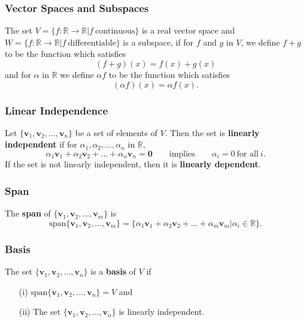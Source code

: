 \documentclass{beamer}
\begin{document}
\begin{frame}
\frametitle{Vector Spaces and Subspaces}
\begin{Example}
The set $V = \{f:\mathbb{R}\to\mathbb{R}| f\ \text{continuous}\}$ is a real vector space and $W = \{f:\mathbb{R}\to\mathbb{R}| f\ \text{differentiable}\}$ is a subspace, if for $f$ and $g$ in $V$, we define $f + g$ to be the function which satisfies 
$$
(f + g)(x) = f(x) + g(x)
$$
and for $\alpha$ in $\mathbb{R}$ we define $\alpha f$ to be the function which satisfies 
$$
(\alpha f)(x) = \alpha f(x).
$$
\end{Example}
\end{frame}

\begin{frame}
\frametitle{Linear Independence}
\begin{Definition}
Let $\{{\boldsymbol v_1}, {\boldsymbol v_2},\ldots, {\boldsymbol v_n}\}$ be a set of elements of $V$. Then the set is {\bf linearly independent} if for $\alpha_1, \alpha_2,\ldots, \alpha_n$ in $\mathbb{R}$, 
$$
\alpha_1 {\boldsymbol v_1} + \alpha_2 {\boldsymbol v_2}+\ldots + \alpha_n {\boldsymbol v_n} = {\boldsymbol 0} \qquad\text{implies}\qquad \alpha_i = 0\ \text{for all}\ i.
$$
If the set is not linearly independent, then it is {\bf linearly dependent}. 
\end{Definition}

\end{frame}

\begin{frame}
\frametitle{Span}
\begin{Definition}
The {\bf span} of $\{{\boldsymbol v_1}, {\boldsymbol v_2},\ldots, {\boldsymbol v_m}\}$ is 
$$
\text{span}\{{\boldsymbol v_1}, {\boldsymbol v_2},\ldots, {\boldsymbol v_m}\} = \{\alpha_1{\boldsymbol v_1} + \alpha_2{\boldsymbol v_2} + \ldots + \alpha_m {\boldsymbol v_m} | \alpha_i\in\mathbb{R}\}.
$$
\end{Definition}
\end{frame}

\begin{frame}
\frametitle{Basis}
\begin{Definition}
The set $\{{\boldsymbol v_1}, {\boldsymbol v_2},\ldots, {\boldsymbol v_n}\}$ is a {\bf basis} of $V$ if
\begin{enumerate}
\item[(i)] $\text{span}\{{\boldsymbol v_1}, {\boldsymbol v_2},\ldots, {\boldsymbol v_n}\} = V$ and
\item[(ii)] The set $\{{\boldsymbol v_1}, {\boldsymbol v_2},\ldots, {\boldsymbol v_n}\}$ is linearly independent.
\end{enumerate}
\end{Definition}
\end{frame}
\end{document}
